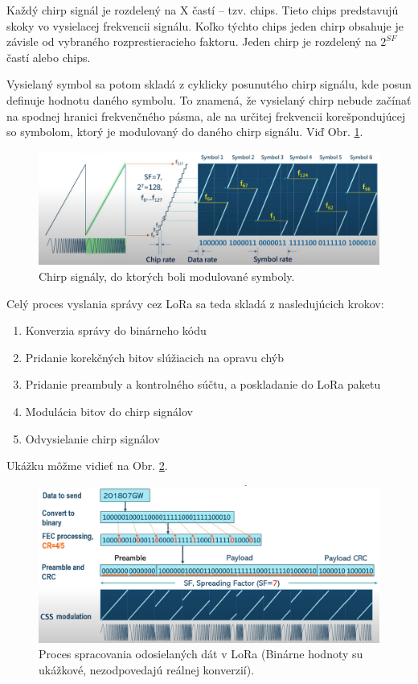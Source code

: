 \documentclass[slovak,master]{diploma}
\begin{document}
Každý chirp signál je rozdelený na X častí -- tzv. chips. Tieto chips predstavujú skoky vo vysielacej frekvencii signálu. 
Koľko týchto chips jeden chirp obsahuje je závisle od vybraného rozprestieracieho faktoru. 
Jeden chirp je rozdelený na $2^{SF}$ častí alebo chips.

Vysielaný symbol sa potom skladá z cyklicky posunutého chirp signálu, kde posun definuje hodnotu daného symbolu. 
To znamená, že vysielaný chirp nebude začínať na spodnej hranici frekvenčného pásma, ale na určitej frekvencii korešpondujúcej so symbolom, 
ktorý je modulovaný do daného chirp signálu. Viď Obr. \ref{fig:loraSymbols}.

\begin{figure}
	\centering
	\includegraphics[width=1\textwidth]{Figures/loraSymbols.png}
	\caption{Chirp signály, do ktorých boli modulované symboly. \cite[Prevzaté z video prezentácie výrobcu GW Instek]{loratester}}
	\label{fig:loraSymbols}
\end{figure}

Celý proces vyslania správy cez LoRa sa teda skladá z nasledujúcich krokov:
\begin{enumerate}
  \item Konverzia správy do binárneho kódu
  \item Pridanie korekčných bitov slúžiacich na opravu chýb
  \item Pridanie preambuly a kontrolného súčtu, a poskladanie do LoRa paketu
  \item Modulácia bitov do chirp signálov
  \item Odvysielanie chirp signálov
\end{enumerate}
Ukážku môžme vidieť na Obr. \ref{fig:loraModulation}.

\begin{figure}
	\centering
	\includegraphics[width=1\textwidth]{Figures/loraModulation2.png}
	\caption{Proces spracovania odosielaných dát v LoRa (Binárne hodnoty su ukážkové, nezodpovedajú reálnej konverzií). \cite[Prevzaté z video prezentácie výrobcu GW Instek]{loratester}}
	\label{fig:loraModulation}
\end{figure}
\end{document}
